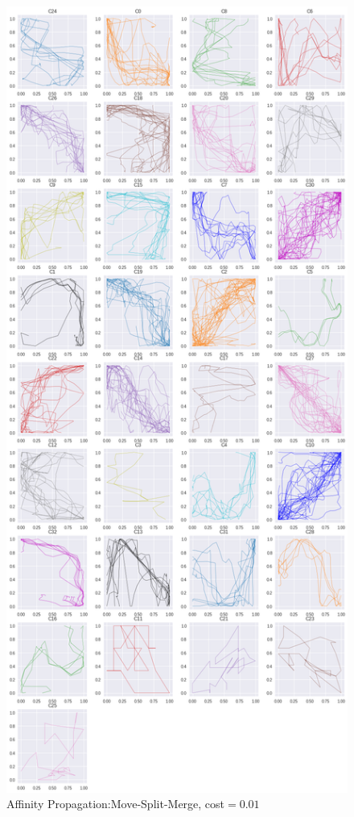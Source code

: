 \begin{figure}[h]
  \centering
  \includegraphics[width=\linewidth,height=\textheight,keepaspectratio]{figs/clusters/CLU_AP_ALL[MSM;c=.01].png}
  \caption{Affinity Propagation:Move-Split-Merge, cost$=0.01$}
\end{figure}

